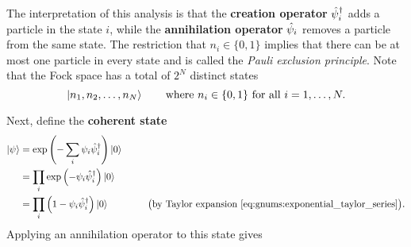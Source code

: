 The interpretation of this analysis is that the \textbf{creation operator} $\hat\psi^\dagger_i$ adds a particle in the state $i$, while the \textbf{annihilation operator} $\hat\psi_i$ removes a particle from the same state.
The restriction that $n_i \in \{0, 1\}$ implies that there can be at most one particle in every state and is called the \emph{Pauli exclusion principle}.
Note that the Fock space has a total of $2^N$ distinct states
\begin{equation}
	\ket{n_1, n_2, \ldots, n_N} \qquad \text{where } n_i \in \{0, 1\} \text{ for all } i = 1, \ldots, N .
\label{eq:tft:fermion_all_states}
\end{equation}

Next, define the \textbf{coherent state}
\begin{equation}
\begin{split}
	\ket{\psi} &= \exp \left( -\sum_i \psi_i \hat\psi^\dagger_i \right) \ket{0} \\
	           &= \prod_i \exp \left( -\psi_i \hat\psi^\dagger_i \right) \ket{0} \\
	           &= \prod_i \left( 1 - \psi_i \hat\psi^\dagger_i \right) \ket{0} \qquad \qquad \big( \text{by Taylor expansion \eqref{eq:gnums:exponential_taylor_series}} \big) .
\end{split}
\label{eq:tft:coherent_state_definition}
\end{equation}
Applying an annihilation operator to this state gives

